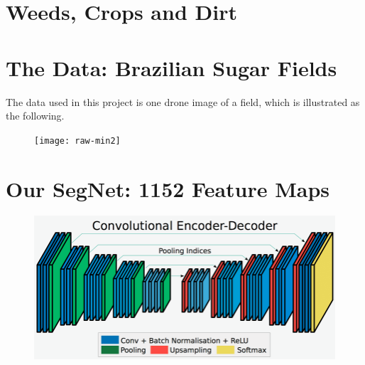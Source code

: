 \documentclass[
    ,title     = {{Image Segmentation for Smart Agriculture}}
    ,subject   = {{This is the subject of my work}}
    ,papersize = {{a1paper}}
    ,nocrop
]{dtuposter}
\begin{document}
%
%
\begin{dtuposterhead} %
\end{dtuposterhead}
%
%
\begin{dtupostercontent}
\section{Weeds, Crops and Dirt}

 
\section{The Data: Brazilian Sugar Fields}
The data used in this project is one drone image of a field, which is illustrated as the following.
\begin{figure}
\centering
\texttt{[image: raw-min2]}
\end{figure}


\section{Our SegNet: 1152 Feature Maps}



\begin{figure}
	\centering
	\includegraphics[width=0.9\linewidth]{Encoder-Decoder2}
	\caption{}
	\label{fig:Structure}
\end{figure}
 

\end{dtupostercontent}
\end{document}
